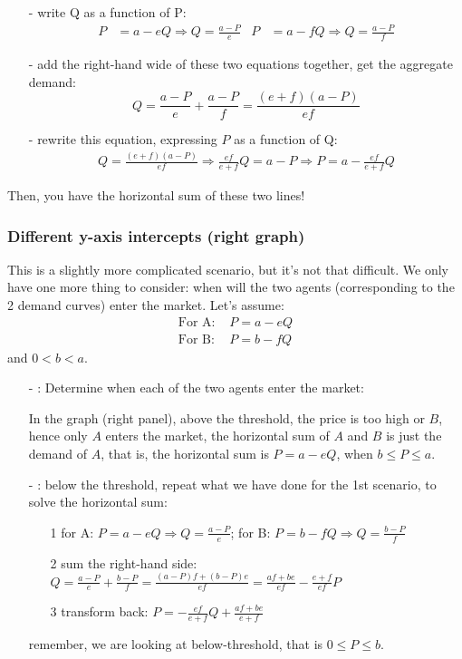 \documentclass[twoside]{article}
\theoremstyle{definition}
\begin{document}
\begin{itemize}
    \item[-]  write Q as a function of P:
    \begin{align*}
        P&=a-eQ\Rightarrow  Q=\frac{a-P}{e} & P&=a-fQ\Rightarrow Q=\frac{a-P}{f}
    \end{align*}
    
    \item[-]  add the right-hand wide of these two equations together, get the aggregate demand:
    $$
    Q = \frac{a-P}{e}+\frac{a-P}{f} = \frac{(e+f)(a-P)}{ef}
    $$
    
    \item[-]  rewrite this equation, expressing $P$ as a function of Q:
    \begin{align*}
        Q=\frac{(e+f)(a-P)}{ef} \Rightarrow \frac{ef}{e+f}Q=a-P \Rightarrow P= a-\frac{ef}{e+f}Q
    \end{align*}
\end{itemize}
Then, you have the horizontal sum of these two lines!

\subsubsection*{Different y-axis intercepts (right graph)}
This is a slightly more complicated scenario, but it's not that difficult. We only have one more thing to consider: when will the two agents (corresponding to the 2 demand curves) enter the market. Let's assume:
\begin{align*}
    \text{For A: } & P=a-eQ\\
    \text{For B: } & P= b-fQ
\end{align*}
and $0<b<a$.

\begin{itemize}
    \item[-] : Determine when each of the two agents enter the market:
    
    In the graph (right panel), above the threshold,  the price is too high or $B$, hence only $A$ enters the market, the horizontal sum of $A$ and $B$ is just the demand of $A$, that is, the horizontal sum is $P=a-eQ$, when $b \leq P\leq a$.
    
    \item[-] : below the threshold, repeat what we have done for the 1st scenario, to solve the horizontal sum:
    \begin{itemize}
        \item[1] for A: $P=a-eQ\Rightarrow Q=\frac{a-P}{e}$; for B: $P=b-fQ\Rightarrow Q=\frac{b-P}{f}$
        \item[2] sum the right-hand side: $Q=\frac{a-P}{e}+ \frac{b-P}{f} = \frac{(a-P)f+(b-P)e}{ef} = \frac{af+be}{ef}- \frac{e+f}{ef}P$
        \item[3] transform back: $P = -\frac{ef}{e+f}Q + \frac{af+be}{e+f}$
    \end{itemize}
    remember, we are looking at below-threshold, that is $0\leq P\leq b$.
\end{itemize}
\end{document}
